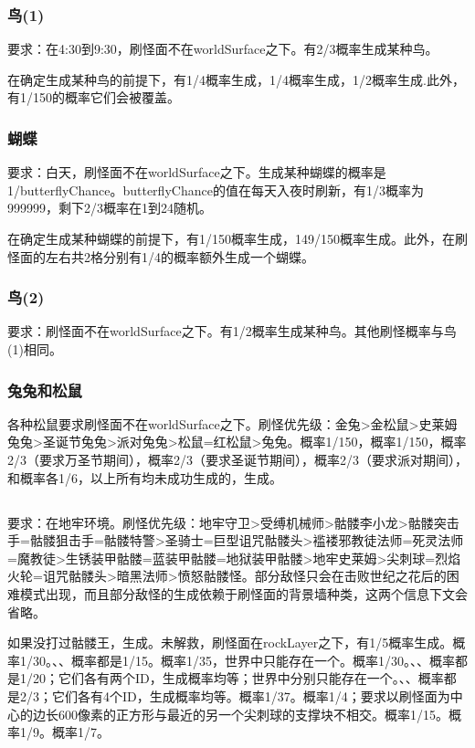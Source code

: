 \subsubsection{鸟(1)}\label{app13}
要求：在4:30到9:30，刷怪面不在worldSurface之下。有2/3概率生成某种鸟。

在确定生成某种鸟的前提下，有1/4概率生成，1/4概率生成，1/2概率生成.此外，有1/150的概率它们会被覆盖。

\subsubsection{蝴蝶}\label{app11}
要求：白天，刷怪面不在worldSurface之下。生成某种蝴蝶的概率是1/butterflyChance。butterflyChance的值在每天入夜时刷新，有1/3概率为999999，剩下2/3概率在1到24随机。

在确定生成某种蝴蝶的前提下，有1/150概率生成，149/150概率生成。此外，在刷怪面的左右共2格分别有1/4的概率额外生成一个蝴蝶。

\subsubsection{鸟(2)}
要求：刷怪面不在worldSurface之下。有1/2概率生成某种鸟。其他刷怪概率与鸟(1)相同。

\subsubsection{兔兔和松鼠}\label{app12}
各种松鼠要求刷怪面不在worldSurface之下。刷怪优先级：金兔>金松鼠>史莱姆兔兔>圣诞节兔兔>派对兔兔>松鼠=红松鼠>兔兔。概率1/150，概率1/150，概率2/3（要求万圣节期间），概率2/3（要求圣诞节期间），概率2/3（要求派对期间），和概率各1/6，以上所有均未成功生成的，生成。

\subsection{}
要求：在地牢环境。刷怪优先级：地牢守卫>受缚机械师>骷髅李小龙>骷髅突击手=骷髅狙击手=骷髅特警>圣骑士=巨型诅咒骷髅头>褴褛邪教徒法师=死灵法师=魔教徒>生锈装甲骷髅=蓝装甲骷髅=地狱装甲骷髅>地牢史莱姆>尖刺球=烈焰火轮=诅咒骷髅头>暗黑法师>愤怒骷髅怪。部分敌怪只会在击败世纪之花后的困难模式出现，而且部分敌怪的生成依赖于刷怪面的背景墙种类，这两个信息下文会省略。

如果没打过骷髅王，生成。未解救，刷怪面在rockLayer之下，有1/5概率生成。概率1/30。、、概率都是1/15。概率1/35，世界中只能存在一个。概率1/30。、、概率都是1/20；它们各有两个ID，生成概率均等；世界中分别只能存在一个。、、概率都是2/3；它们各有4个ID，生成概率均等。概率1/37。概率1/4；要求以刷怪面为中心的边长600像素的正方形与最近的另一个尖刺球的支撑块不相交。概率1/15。概率1/9。概率1/7。

